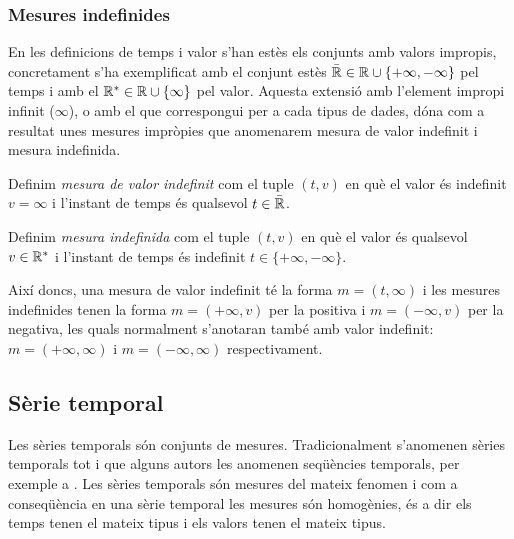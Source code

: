 \subsubsection{Mesures indefinides}



En les definicions de temps i valor s'han estès els conjunts amb
valors impropis, concretament s'ha exemplificat amb el conjunt estès
 $\bar{\mathbb{R}{}} \in \mathbb{R}{} \cup \{+\infty,-\infty\}$
pel temps i amb el $\mathbb{R}{}^*\in\mathbb{R}{} \cup\{\infty\}$ pel
valor. Aquesta extensió amb l'element impropi infinit ($\infty$), o
amb el que correspongui per a cada tipus de dades, dóna com a resultat
unes mesures impròpies que anomenarem mesura de valor indefinit i
mesura indefinida.

\begin{definition}
  \label{def:model:mesura_valor_indefinit}
  Definim \emph{mesura de valor indefinit} com el tuple $(t,v)$ en
  què el valor és indefinit $v=\infty$ i l'instant de temps és
  qualsevol $t\in\bar{\mathbb{R}{}}$.
\end{definition}

\begin{definition}
  \label{def:model:mesura_indefinida}
  Definim \emph{mesura indefinida} com el tuple $(t,v)$ en què el
  valor és qualsevol $v\in\mathbb{R}{}^*$ i l'instant de temps és indefinit
  $t\in\{+\infty,-\infty\}$.
\end{definition}

Així doncs, una mesura de valor indefinit té la forma $m=(t,\infty)$
i les mesures indefinides tenen la forma $m=(+\infty,v)$ per la
positiva i $m=(-\infty,v)$ per la negativa, les quals normalment
s'anotaran també amb valor indefinit: $m=(+\infty,\infty)$ i
$m=(-\infty,\infty)$ respectivament.








\subsection{Sèrie temporal}
\label{sec:model:serietemporal}

Les sèries temporals són conjunts de mesures.
Tradicionalment s'anomenen sèries temporals tot i que alguns autors
les anomenen seqüències temporals, per exemple a \cite{last:hetland}.
Les sèries temporals són mesures del mateix fenomen i com a
conseqüència en una sèrie temporal les mesures són homogènies, és a
dir els temps tenen el mateix tipus i els valors tenen el mateix
tipus. 



